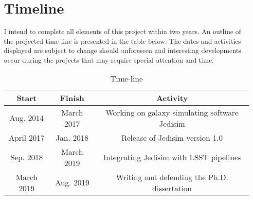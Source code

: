 \section{Timeline}
I intend to complete all elements of this project within two years.
An outline of the projected time line is presented in the table below.
The dates and activities displayed are subject to change should
unforeseen and interesting developments occur during the projects that
may require special attention and time.
\begin{table}[h]
\caption{Time-line}
\vspace{5mm}
\centering
        \begin{tabular}{|c|c|c|}
            \hline
            Start&Finish&Activity\\
            \hline
            Aug. 2014& March 2017 &  Working on galaxy simulating software Jedisim \\
            \hline
            April 2017 & Jan. 2018 &  Release of Jedisim version 1.0 \\
            \hline
            Sep. 2018 & March 2019 & Integrating Jedisim with LSST pipelines \\
            \hline
            March 2019 & Aug. 2019& Writing and defending the Ph.D. dissertation   \\
            \hline
            \end{tabular}
\end{table}

